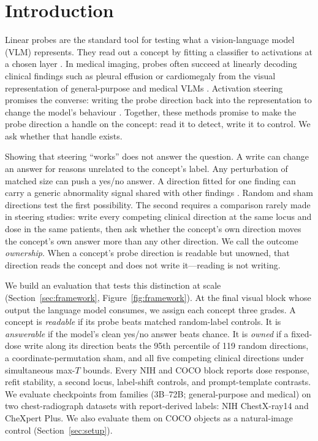 \section{Introduction}
\label{sec:introduction}

Linear probes are the standard tool for testing what a vision-language model (VLM) represents. They read out a concept by fitting a classifier to activations at a chosen layer \citep{alain2017understanding,belinkov2022probing}. In medical imaging, probes often succeed at linearly decoding clinical findings such as pleural effusion or cardiomegaly from the visual representation of general-purpose and medical VLMs \citep{zhu2026lost,pedersen2026probes}. Activation steering promises the converse: writing the probe direction back into the representation to change the model's behaviour \citep{turner2023steering,panickssery2024caa}. Together, these methods promise to make the probe direction a handle on the concept: read it to detect, write it to control. We ask whether that handle exists.

Showing that steering ``works'' does not answer the question. A write can change an answer for reasons unrelated to the concept's label. Any perturbation of matched size can push a yes/no answer. A direction fitted for one finding can carry a generic abnormality signal shared with other findings \citep{pahde2025navigating}. Random and sham directions test the first possibility. The second requires a comparison rarely made in steering studies: write every competing clinical direction at the same locus and dose in the same patients, then ask whether the concept's own direction moves the concept's own answer more than any other direction. We call the outcome \emph{ownership}. When a concept's probe direction is readable but unowned, that direction reads the concept and does not write it---reading is not writing.

We build an evaluation that tests this distinction at scale (Section~\ref{sec:framework}, Figure~\ref{fig:framework}). At the final visual block whose output the language model consumes, we assign each concept three grades. A concept is \emph{readable} if its probe beats matched random-label controls. It is \emph{answerable} if the model's clean yes/no answer beats chance. It is \emph{owned} if a fixed-dose write along its direction beats the 95th percentile of 119 random directions, a coordinate-permutation sham, and all five competing clinical directions under simultaneous max-$T$ bounds. Every NIH and COCO block reports dose response, refit stability, a second locus, label-shift controls, and prompt-template contrasts. We evaluate \cfCheckpoints{} checkpoints from \cfFamiliesWord{} families (3B--72B; general-purpose and medical) on two chest-radiograph datasets with report-derived labels: NIH ChestX-ray14 and CheXpert Plus. We also evaluate them on COCO objects as a natural-image control (Section~\ref{sec:setup}).

